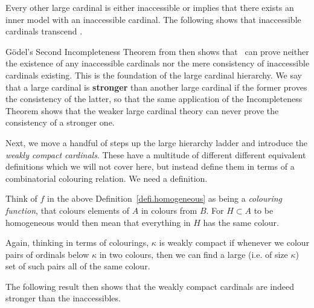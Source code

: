 \documentclass[../../main]{subfiles}
\begin{document}
Every other large cardinal is either inaccessible or implies that there exists an inner model with an inaccessible cardinal. The following shows that inaccessible cardinals transcend \zfc.


G\"odel's Second Incompleteness Theorem from \cite{godel-incompleteness} then shows that \zfc\ can prove neither the existence of any inaccessible cardinals nor the mere consistency of inaccessible cardinals existing. This is the foundation of the large cardinal hierarchy. We say that a large cardinal is \textbf{stronger} than another large cardinal if the former proves the consistency of the latter, so that the same application of the Incompleteness Theorem shows that the weaker large cardinal theory can never prove the consistency of a stronger one.

\qquad Next, we move a handful of steps up the large hierarchy ladder and introduce the \textit{weakly compact cardinals}. These have a multitude of different different equivalent definitions which we will not cover here, but instead define them in terms of a combinatorial colouring relation. We need a definition.


Think of $f$ in the above Definition~\ref{defi.homogeneous} as being a \textit{colouring function}, that colours elements of $A$ in colours from $B$. For $H\subset A$ to be homogeneous would then mean that everything in $H$ has the same colour.


Again, thinking in terms of colourings, $\kappa$ is weakly compact if whenever we colour pairs of ordinals below $\kappa$ in two colours, then we can find a large (i.e. of size $\kappa$) set of such pairs all of the same colour.

\qquad The following result then shows that the weakly compact cardinals are indeed stronger than the inaccessibles.

\end{document}
